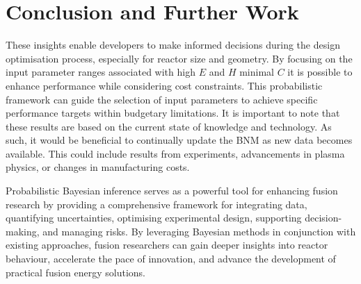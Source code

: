 \documentclass[journal]{IEEEtran}
\begin{document}


\section{Conclusion and Further Work}\label{sec:conc}

These insights enable developers to make informed decisions during the design optimisation process, especially for reactor size and geometry. By focusing on the input parameter ranges associated with high $E$ and $H$ minimal $C$ it is possible to enhance performance while considering cost constraints. This probabilistic framework can guide the selection of input parameters to achieve specific performance targets within budgetary limitations. It is important to note that these results are based on the current state of knowledge and technology. As such, it would be beneficial to continually update the BNM as new data becomes available. This could include results from experiments, advancements in plasma physics, or changes in manufacturing costs.

Probabilistic Bayesian inference serves as a powerful tool for enhancing fusion research by providing a comprehensive framework for integrating data, quantifying uncertainties, optimising experimental design, supporting decision-making, and managing risks. By leveraging Bayesian methods in conjunction with existing approaches, fusion researchers can gain deeper insights into reactor behaviour, accelerate the pace of innovation, and advance the development of practical fusion energy solutions.
\end{document}
